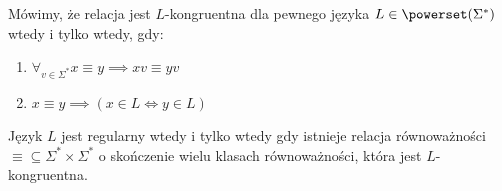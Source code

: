 \begin{definition}
	Mówimy, że relacja jest \(L\)-kongruentna dla pewnego języka \(L \in \powerset(\Sigma^*)\) wtedy i tylko wtedy, gdy:
	\begin{enumerate}
		\item \(\forall_{v \in \Sigma^*} x \equiv y \implies xv \equiv yv \)
		\item \( x \equiv y \implies (x \in L \iff y \in L)\)
	\end{enumerate}
\end{definition}


\begin{theorem}
	Język \( L \) jest regularny wtedy i tylko wtedy gdy
	istnieje relacja równoważności \( \equiv \subseteq \Sigma^* \times \Sigma^*\) o skończenie wielu klasach równoważności, która jest \(L\)-kongruentna.
\end{theorem}
